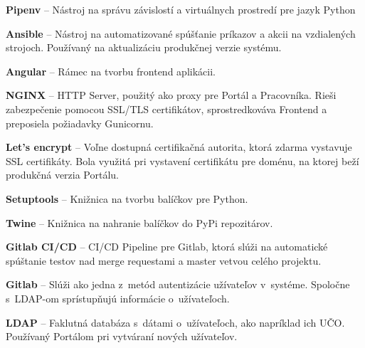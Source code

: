 \documentclass[
  digital, %
  oneside, %
  table,   %
  lof,     %
  lot,   %
]{fithesis3}
\begin{document}
\textbf{Pipenv} -- Nástroj na správu závislostí a virtuálnych prostredí pre jazyk Python

\textbf{Ansible} -- Nástroj na automatizované spúšťanie príkazov a akcii na vzdialených strojoch. Používaný na aktualizáciu produkčnej verzie systému.

\textbf{Angular} -- Rámec na tvorbu frontend aplikácii.

\textbf{NGINX} -- HTTP Server, použitý ako proxy pre Portál a Pracovníka. Rieši zabezpečenie pomocou SSL/TLS certifikátov, sprostredkováva Frontend a preposiela požiadavky Gunicornu.

\textbf{Let's encrypt} -- Voľne dostupná certifikačná autorita, ktorá zdarma vystavuje SSL certifikáty. Bola využitá pri vystavení certifikátu pre doménu, na ktorej beží produkčná verzia Portálu.

\textbf{Setuptools} -- Knižnica na tvorbu balíčkov pre Python.

\textbf{Twine} -- Knižnica na nahranie balíčkov do PyPi repozitárov.

\textbf{Gitlab CI/CD} -- CI/CD Pipeline pre Gitlab, ktorá slúži na automatické spúštanie testov nad merge requestami a master vetvou celého projektu.

\textbf{Gitlab} -- Slúži ako jedna z~metód autentizácie užívateľov v~systéme. Spoločne s~LDAP-om sprístupňujú informácie o~užívateľoch.

\textbf{LDAP} -- Faklutná databáza s~dátami o~užívateľoch, ako napríklad ich UČO. Používaný Portálom pri vytváraní nových užívateľov.
\end{document}
